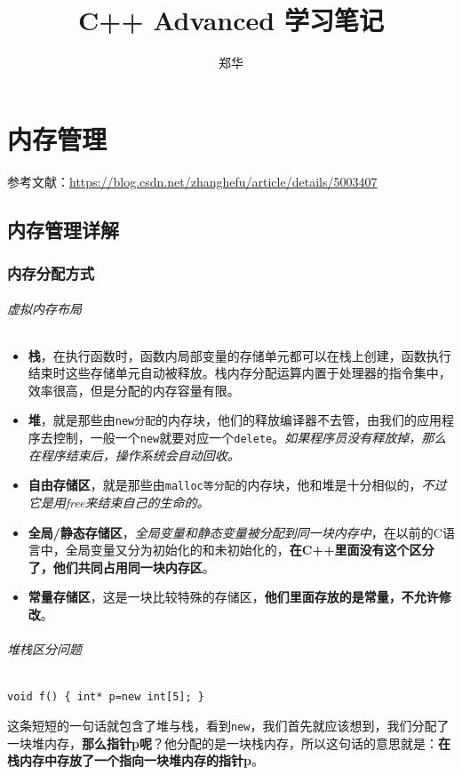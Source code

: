 \documentclass[UTF8,a4paper,12pt]{ctexbook}
\author{\kaishu 郑华}
\title{ \textbf{C++ Advanced 学习笔记\textbf{}}}
\begin{document}
 	\maketitle
	\tableofcontents

\chapter{内存管理}
	参考文献：\url{https://blog.csdn.net/zhanghefu/article/details/5003407}
	
	\section{内存管理详解}
		\subsection{内存分配方式}
			\subparagraph{虚拟内存布局}
				\begin{itemize}
					\item \textbf{栈}，在执行函数时，函数内局部变量的存储单元都可以在栈上创建，函数执行结束时这些存储单元自动被释放。栈内存分配运算内置于处理器的指令集中，效率很高，但是分配的内存容量有限。
					
					\item \textbf{堆}，就是那些由\verb|new分配|的内存块，他们的释放编译器不去管，由我们的应用程序去控制，一般一个\verb|new|就要对应一个\verb|delete|。\textit{如果程序员没有释放掉，那么在程序结束后，操作系统会自动回收。}
					
					\item \textbf{自由存储区}，就是那些由\verb|malloc等分配|的内存块，他和堆是十分相似的，\textit{不过它是用free来结束自己的生命的。}
					
					\item \textbf{全局/静态存储区}，\textit{全局变量和静态变量被分配到同一块内存中}，在以前的C语言中，全局变量又分为初始化的和未初始化的，\textbf{在C++里面没有这个区分了，他们共同占用同一块内存区}。
					
					\item \textbf{常量存储区}，这是一块比较特殊的存储区，\textbf{他们里面存放的是常量，不允许修改}。
				\end{itemize}

			\subparagraph{堆栈区分问题}
				\verb|void f() { int* p=new int[5]; }|
				
				这条短短的一句话就包含了堆与栈，看到\verb|new|，我们首先就应该想到，我们分配了一块堆内存，\textbf{那么指针p呢}？他分配的是一块栈内存，所以这句话的意思就是：\textbf{在栈内存中存放了一个指向一块堆内存的指针p}。
				
\end{document}
